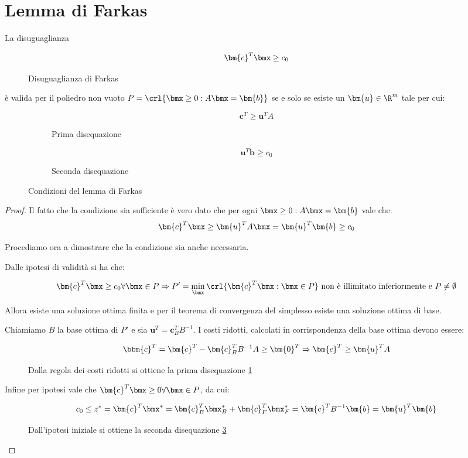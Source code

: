 \documentclass[\main/main.tex]{subfiles}
\begin{document}
\section{Lemma di Farkas}
\begin{theorem}
  \label{lemma_farkas}
  La disuguaglianza
  \begin{figure}
    \[
      \bm{c}^T\bmx  \geq c_0
    \]
    \caption{Disuguaglianza di Farkas}
  \end{figure}
  è valida per il poliedro non vuoto $P = \crl{\bmx \geq 0: A\bmx = \bm{b}}$ se e solo se esiste un $\bm{u} \in \R^m$ tale per cui:

  \begin{figure}
    \begin{subfigure}{0.49\textwidth}
      \[
        \bm{c}^T \geq \bm{u}^TA
      \]
      \caption{Prima disequazione}
      \label{farkas_prima}
    \end{subfigure}
    \begin{subfigure}{0.49\textwidth}
      \[
        \bm{u}^T\bm{b}\geq c_0
      \]
      \caption{Seconda disequazione}
      \label{farkas_seconda}
    \end{subfigure}
    \caption{Condizioni del lemma di Farkas}
  \end{figure}
\end{theorem}

\begin{proof}
  Il fatto che la condizione sia sufficiente è vero dato che per ogni $\bmx \geq 0: A\bmx=\bm{b}$ vale che:
  \[
    \bm{c}^T\bmx \geq \bm{u}^TA\bmx = \bm{u}^T\bm{b} \geq c_0
  \]

  Procediamo ora a dimostrare che la condizione sia anche necessaria.

  Dalle ipotesi di validità si ha che:

  \[
    \bm{c}^T\bmx \geq c_0 \forall \bmx \in P \Rightarrow P' = \min_{\bmx}\crl{\bm{c}^T\bmx: \bmx \in P} \text{ non è illimitato inferiormente e } P \neq \emptyset
  \]

  Allora esiste una soluzione ottima finita e per il teorema di convergenza del simplesso esiste una soluzione ottima di base.

  Chiamiamo $B$ la base ottima di $P'$ e sia $\bm{u}^T = \bm{c}^T_B B^{-1}$. I costi ridotti, calcolati in corrispondenza della base ottima devono essere:

  \begin{figure}
    \[
      \bbm{c}^T = \bm{c}^T - \bm{c}_B^TB^{-1}A \geq \bm{0}^T \Rightarrow \bm{c}^T \geq \bm{u}^TA
    \]
    \caption{Dalla regola dei costi ridotti si ottiene la prima disequazione \ref{farkas_prima}}
  \end{figure}

  Infine per ipotesi vale che $\bm{c}^T \bmx \geq 0 \forall \bmx \in P$, da cui:

  \begin{figure}
    \[
      c_0 \leq z^* = \bm{c}^T\bmx^* = \bm{c}_B^T \bmx^*_B + \bm{c}_F^T \bmx^*_F = \bm{c}^TB^{-1}\bm{b} = \bm{u}^T\bm{b}
    \]
    \caption{Dall'ipotesi iniziale si ottiene la seconda disequazione \ref{farkas_seconda}}
  \end{figure}

\end{proof}
\end{document}
